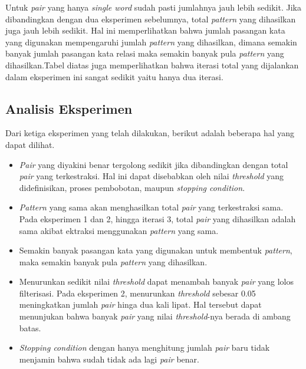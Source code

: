 Untuk \textit{pair} yang hanya \textit{single word} sudah pasti jumlahnya jauh lebih sedikit. Jika dibandingkan dengan dua eksperimen sebelumnya, total \textit{pattern} yang dihasilkan juga jauh lebih sedikit. Hal ini memperlihatkan bahwa jumlah pasangan kata yang digunakan mempengaruhi jumlah \textit{pattern} yang dihasilkan, dimana semakin banyak jumlah pasangan kata relasi maka semakin banyak pula \textit{pattern} yang dihasilkan.Tabel diatas juga memperlihatkan bahwa iterasi total yang dijalankan dalam eksperimen ini sangat sedikit yaitu hanya dua iterasi.
%

\subsection{Analisis Eksperimen}
Dari ketiga eksperimen yang telah dilakukan, berikut adalah beberapa hal yang dapat dilihat.
\begin{itemize}
  \item \textit{Pair} yang diyakini benar tergolong sedikit jika dibandingkan dengan total \textit{pair} yang terkestraksi. Hal ini dapat disebabkan oleh nilai \textit{threshold} yang didefinisikan, proses pembobotan, maupun \textit{stopping condition}.
  \item \textit{Pattern} yang sama akan menghasilkan total \textit{pair} yang terkestraksi sama. Pada eksperimen 1 dan 2, hingga iterasi 3, total \textit{pair} yang dihasilkan adalah sama akibat ektraksi menggunakan \textit{pattern} yang sama.
  \item Semakin banyak pasangan kata yang digunakan untuk membentuk \textit{pattern}, maka semakin banyak pula \textit{pattern} yang dihasilkan.
  \item Menurunkan sedikit nilai \textit{threshold} dapat menambah banyak \textit{pair} yang lolos filterisasi. Pada eksperimen 2, menurunkan \textit{threshold} sebesar 0.05 meningkatkan jumlah \textit{pair} hinga dua kali lipat. Hal tersebut dapat menunjukan bahwa banyak \textit{pair} yang nilai \textit{threshold}-nya berada di ambang batas. 
  \item \textit{Stopping condition} dengan hanya menghitung jumlah \textit{pair} baru tidak menjamin bahwa sudah tidak ada lagi \textit{pair} benar. 
\end{itemize}

